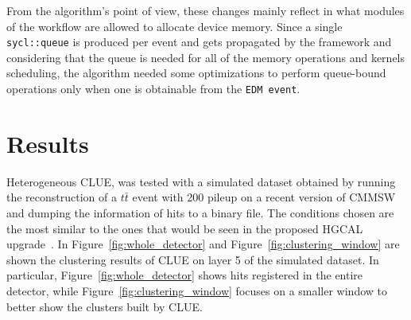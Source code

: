 From the algorithm's point of view, these changes mainly reflect in what modules of the workflow are allowed to allocate device memory. Since a single \texttt{sycl::queue} is produced per event and gets propagated by the framework and considering that the queue is needed for all of the memory operations and kernels scheduling, the algorithm needed some optimizations to perform queue-bound operations only when one is obtainable from the \texttt{EDM event}.

\section{Results}
Heterogeneous CLUE, was tested with a simulated dataset obtained by running the reconstruction of a $t\bar{t}$ event with 200 pileup on a recent version of CMMSW and dumping the information of hits to a binary file. The conditions chosen are the most similar to the ones that would be seen in the proposed HGCAL upgrade~\cite{hgcal}. 
\newline
In Figure~\ref{fig:whole_detector} and Figure~\ref{fig:clustering_window} are shown the clustering results of CLUE on layer 5 of the simulated dataset. In particular, Figure~\ref{fig:whole_detector} shows hits registered in the entire detector, while Figure~\ref{fig:clustering_window} focuses on a smaller window to better show the clusters built by CLUE.

